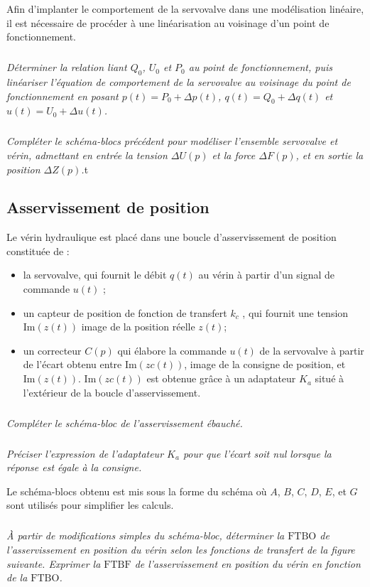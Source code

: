 \documentclass[10pt,fleqn]{article} %
\begin{document}
\begin{multicols}{2}
Afin d’implanter le comportement de la servovalve dans une modélisation linéaire, il est nécessaire
de procéder à une linéarisation au voisinage d’un point de fonctionnement.

\subparagraph{}\textit{Déterminer la relation liant $Q_0$, $U_0$ et $P_0$ au point de fonctionnement, puis linéariser l’équation de comportement de la servovalve au voisinage du point de fonctionnement en posant
$p(t ) = P_0 +\Delta p(t )$, $q(t ) =Q_0 +\Delta q(t )$ et $u(t ) =U_0 +\Delta u(t )$.}

\subparagraph{}\textit{Compléter le schéma-blocs précédent pour modéliser l’ensemble servovalve et vérin, admettant
en entrée la tension $\Delta U(p)$ et la force $\Delta F(p)$, et en sortie la position $\Delta Z(p)$.}t

\subsection*{Asservissement de position}

Le vérin hydraulique est placé dans une boucle d’asservissement de position constituée de :
\begin{itemize}
\item la servovalve, qui fournit le débit $q(t )$ au vérin à partir d’un signal de commande $u(t)$ ;
\item un capteur de position de fonction de transfert $k_c$ , qui fournit une tension $\text{Im}(z (t ))$ image
de la position réelle $z (t )$;
\item un correcteur $C(p)$ qui élabore la commande $u(t )$ de la servovalve à partir de l’écart obtenu
entre $\text{Im}(z c (t ))$, image de la consigne de position, et $\text{Im}(z (t ))$.
$\text{Im}(zc (t ))$ est obtenue grâce à un adaptateur $K_a$ situé à l’extérieur de la boucle d’asservissement.
\end{itemize}


\subparagraph{}\textit{Compléter le schéma-bloc de l’asservissement ébauché.}
\subparagraph{}\textit{Préciser l’expression de l’adaptateur $K_a$ pour que l’écart soit nul lorsque la réponse est égale
à la consigne.}

Le schéma-blocs obtenu est mis sous la forme du schéma  où $A$, $B$, $C$, $D$, $E$, et $G$
sont utilisés pour simplifier les calculs.

\subparagraph{}\textit{À partir de modifications simples du schéma-bloc, déterminer la $\text{FTBO}$ de l’asservissement
en position du vérin selon les fonctions de transfert de la figure suivante. Exprimer la $\text{FTBF}$ de
l’asservissement en position du vérin en fonction de la $\text{FTBO}$.}


\end{multicols}
\end{document}
